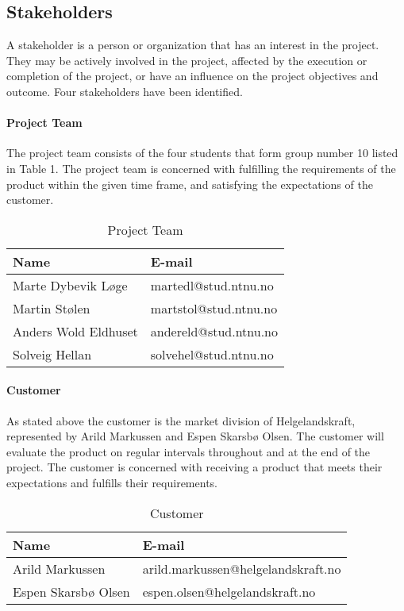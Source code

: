 \subsection{Stakeholders}

A stakeholder is a person or organization that has an interest in the project. They may be actively involved in the project, affected by the execution or completion of the project, or have an influence on the project objectives and outcome. Four stakeholders have been identified.

\paragraph{Project Team}

The project team consists of the four students that form group number 10 listed in Table 1. The project team is concerned with fulfilling the requirements of the product within the given time frame, and satisfying the expectations of the customer.

\begin{table}[H]
\begin{center}
    \begin{tabular}{| l | l |}
   	\hline
    {\bf Name} & {\bf E-mail} \\ \hline
    Marte Dybevik Løge & martedl@stud.ntnu.no \\ \hline
    Martin Stølen & martstol@stud.ntnu.no \\ \hline
    Anders Wold Eldhuset & andereld@stud.ntnu.no \\ \hline
    Solveig Hellan & solvehel@stud.ntnu.no \\ 
    \hline
    \end{tabular}
\end{center}

\caption{Project Team}
\end{table}

\paragraph{Customer}

As stated above the customer is the market division of Helgelandskraft, represented by Arild Markussen and Espen Skarsbø Olsen. The customer will evaluate the product on regular intervals throughout and at the end of the project. The customer is concerned with receiving a product that meets their expectations and fulfills their requirements.

\begin{table}[H]

\begin{center}
    \begin{tabular}{| l | l |}
   	\hline
    {\bf Name} & {\bf E-mail} \\ \hline
    Arild Markussen & arild.markussen@helgelandskraft.no \\ \hline
    Espen Skarsbø Olsen & espen.olsen@helgelandskraft.no \\
    \hline
    \end{tabular}
\end{center}

\caption{Customer}
\end{table}

